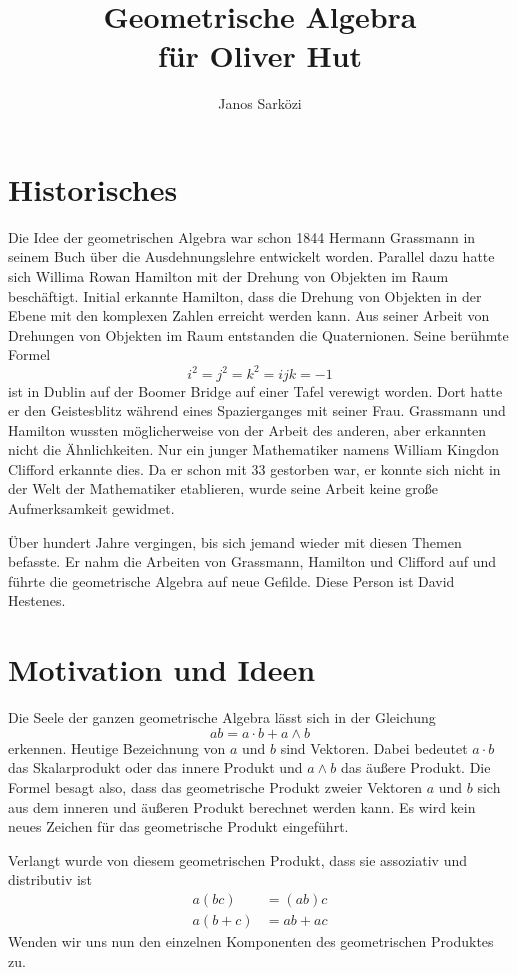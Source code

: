 \documentclass[fleqn]{scrartcl}
\title{Geometrische Algebra \\
für Oliver Hut}
\author{Janos Sarközi}
\numberwithin{equation}{section}
\begin{document}
\maketitle
\newpage
\section{Historisches}
Die Idee der geometrischen Algebra war schon 1844 Hermann Grassmann in seinem
Buch über die Ausdehnungslehre entwickelt worden. Parallel dazu hatte sich
Willima Rowan Hamilton mit der Drehung von Objekten im Raum beschäftigt.
Initial erkannte Hamilton, dass die Drehung von Objekten in der Ebene mit den
komplexen Zahlen erreicht werden kann. Aus seiner Arbeit von Drehungen von
Objekten im Raum entstanden die Quaternionen. Seine berühmte Formel
\[i^2=j^2=k^2=ijk=-1\]
ist in Dublin auf der Boomer Bridge auf einer Tafel verewigt worden. Dort
hatte er den Geistesblitz während eines Spazierganges mit seiner Frau.
Grassmann und Hamilton wussten möglicherweise von der Arbeit des anderen,
aber erkannten nicht die Ähnlichkeiten. Nur ein junger Mathematiker namens
William Kingdon Clifford erkannte dies. Da er schon mit 33 gestorben war,
er konnte sich nicht in der Welt der Mathematiker etablieren, wurde seine
Arbeit keine große Aufmerksamkeit gewidmet.

Über hundert Jahre vergingen, bis sich jemand wieder mit diesen Themen
befasste. Er nahm die Arbeiten von Grassmann, Hamilton und Clifford auf und
führte die geometrische Algebra auf neue Gefilde. Diese Person ist David
Hestenes.

\section{Motivation und Ideen}
Die Seele der ganzen geometrische Algebra lässt sich in der
Gleichung
\[ab = a\cdot b + a\wedge b\]
erkennen. Heutige Bezeichnung von $a$ und $b$ sind Vektoren. Dabei bedeutet
$a\cdot b$ das Skalarprodukt oder das innere Produkt und $a\wedge b$ das
äußere Produkt. Die Formel besagt also, dass das geometrische Produkt zweier
Vektoren $a$ und $b$ sich aus dem inneren und äußeren Produkt berechnet
werden kann. Es wird kein neues Zeichen für das geometrische Produkt
eingeführt.

Verlangt wurde von diesem geometrischen Produkt, dass sie assoziativ und 
distributiv ist
\begin{align*}
    a(bc) &= (ab)c \\
    a(b+c) &= ab + ac
\end{align*}
Wenden wir uns nun den einzelnen Komponenten des geometrischen Produktes zu.
\end{document}

